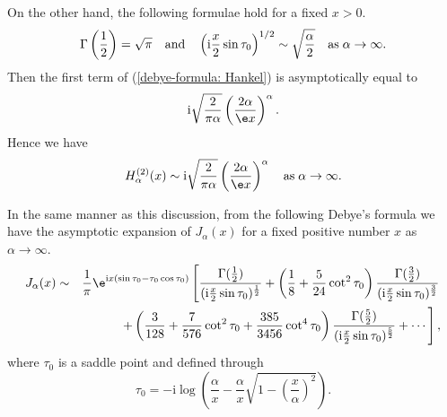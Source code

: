 \documentclass[12pt]{report}
\begin{document}
On the other hand, the following formulae hold for a fixed $x>0$.
\begin{displaymath}
\Gamma\left(\frac{1}{2}\right)=\sqrt{\pi} \quad {\rm and} \quad \left(\mathrm{i}\frac{x}{2}\sin\tau_0\right)^{1/2} \sim \sqrt{\frac{\alpha}{2}}\quad {\rm as}\;\alpha\rightarrow\infty.
\end{displaymath}
Then the first term of (\ref{debye-formula: Hankel}) is asymptotically equal to
\begin{displaymath}
\mathrm{i}\sqrt{\frac{2}{\pi\alpha}}\left(\frac{2\alpha}{\e x}\right)^\alpha.
\end{displaymath}
Hence we have
\begin{displaymath}
H^{(2)}_\alpha(x) \sim \mathrm{i}\sqrt{\frac{2}{\pi\alpha}}\left(\frac{2\alpha}{\e x}\right)^\alpha \quad {\rm as}\;\alpha\rightarrow\infty.
\end{displaymath}

In the same manner as this discussion, from the following Debye's formula\cite{Debye} we have the asymptotic expansion of $J_\alpha(x)$ for a fixed positive number $x$ as $\alpha\rightarrow\infty$.
\begin{eqnarray}
J_{\alpha}(x)&\sim&\frac{\mathrm{1}}{\pi}\e^{\mathrm{i}x(\sin\tau_0-\tau_0\cos\tau_0)}\left[\frac{\Gamma(\frac{1}{2})}{(\mathrm{i}\frac{x}{2}\sin\tau_0)^{\frac{1}{2}}}+\left(\frac{1}{8}+\frac{5}{24}\cot^2\tau_0\right)\frac{\Gamma(\frac{3}{2})}{(\mathrm{i}\frac{x}{2}\sin\tau_0)^{\frac{3}{2}}}\right. \nonumber\\
&&\left.+\left(\frac{3}{128}+\frac{7}{576}\cot^2\tau_0+\frac{385}{3456}\cot^4\tau_0\right)\frac{\Gamma(\frac{5}{2})}{(\mathrm{i}\frac{x}{2}\sin\tau_0)^{\frac{5}{2}}}+\cdots\right],
\label{debye-formula: Bessel}
\end{eqnarray}
where $\tau_0$ is a saddle point and defined through
\begin{equation}
\tau_0=-\mathrm{i}\log\left(\frac{\alpha}{x}-\frac{\alpha}{x}\sqrt{1-\left(\frac{x}{\alpha}\right)^2}\right).
\label{tau_0-2}
\end{equation}

\cleardoublepage
{}

\end{document}
